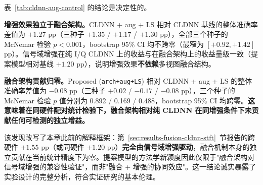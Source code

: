 表~\ref{tab:cldnn-aug-control} 的结论是决定性的。

\textbf{增强效果独立于融合架构。}CLDNN + aug + LS 相对 CLDNN 基线的整体准确率差值为 $+1.27$ pp（三种子 $+1.35$ / $+1.17$ / $+1.30$ pp），全部三个种子的 McNemar 检验 $p < 0.001$，bootstrap 95\% CI 均不跨零（最窄为 $[+0.92, +1.42]$ pp）。信号域增强在纯 I/Q CLDNN 上的收益与在融合架构上的收益量级一致（提案模型相对基线 $+1.20$ pp），说明增强效果\textbf{不依赖}多视图融合结构。

\textbf{融合架构贡献归零。}Proposed (\texttt{arch+aug+LS}) 相对 CLDNN + aug + LS 的整体准确率差值为 $-0.08$ pp（三种子 $+0.02$ / $-0.17$ / $-0.08$ pp），三个种子的 McNemar 检验 $p$ 值分别为 0.892 / 0.169 / 0.488，bootstrap 95\% CI 均跨零。\textbf{这意味着在同硬件配对统计检验下，融合架构相对纯 CLDNN 在同增强条件下未贡献任何可检测的独立增益。}

该发现改写了本章此前的解释框架：第~\ref{sec:results-fusion-cldnn-stft}~节报告的跨硬件 $+1.55$ pp（或同硬件 $+1.20$ pp）\textbf{完全由信号域增强驱动}，融合机制本身的独立贡献在当前统计精度下为零。提案模型的方法学新颖度因此仅限于"融合架构对信号域增强的兼容性验证"，而非"融合 + 增强的协同效应"。这一结论诚实暴露了实验设计的完整分析，符合实证研究的基本伦理。
